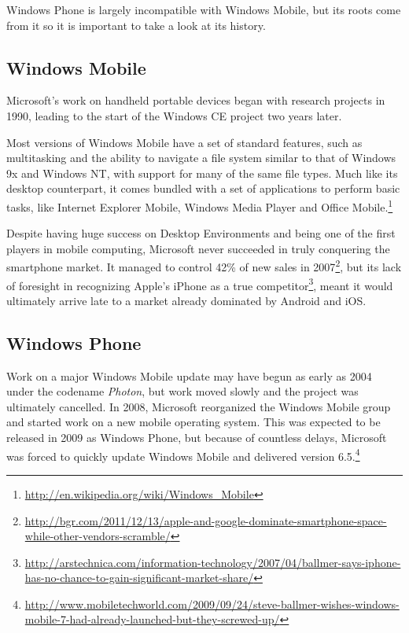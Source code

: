 Windows Phone is largely incompatible with Windows Mobile, but its roots come from it so it is important to take a look at its history.
\subsection{Windows Mobile}
Microsoft's work on handheld portable devices began with research projects in 1990, leading to the start of the Windows CE project two years later.

Most versions of Windows Mobile have a set of standard features, such as multitasking and the ability to navigate a file system similar to that of Windows 9x and Windows NT, with support for many of the same file types. Much like its desktop counterpart, it comes bundled with a set of applications to perform basic tasks, like Internet Explorer Mobile, Windows Media Player and Office Mobile.\footnote{\url{http://en.wikipedia.org/wiki/Windows_Mobile}}

Despite having huge success on Desktop Environments and being one of the first players in mobile computing, Microsoft never succeeded in truly conquering the smartphone market. It managed to control 42\% of new sales in 2007\footnote{\url{http://bgr.com/2011/12/13/apple-and-google-dominate-smartphone-space-while-other-vendors-scramble/}}, but its lack of foresight in recognizing Apple's iPhone as a true competitor\footnote{\url{http://arstechnica.com/information-technology/2007/04/ballmer-says-iphone-has-no-chance-to-gain-significant-market-share/}}, meant it would ultimately arrive late to a market already dominated by Android and iOS.


\subsection{Windows Phone}
Work on a major Windows Mobile update may have begun as early as 2004 under the codename \textit{Photon}, but work moved slowly and the project was ultimately cancelled. In 2008, Microsoft reorganized the Windows Mobile group and started work on a new mobile operating system. This was expected to be released in 2009 as Windows Phone, but because of countless delays, Microsoft was forced to quickly update Windows Mobile and delivered version 6.5.\footnote{\url{http://www.mobiletechworld.com/2009/09/24/steve-ballmer-wishes-windows-mobile-7-had-already-launched-but-they-screwed-up/}} 

